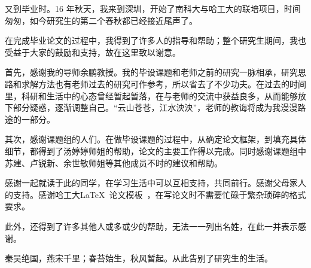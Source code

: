 \begin{acknowledgements}

又到毕业时。16 年秋天，我来到深圳，开始了南科大与哈工大的联培项目，时间匆匆，如今研究生的第二个春秋都已经接近尾声了。

在完成毕业论文的过程中，我得到了许多人的指导和帮助；整个研究生期间，我也受益于大家的鼓励和支持，故在这里致以谢意。

首先，感谢我的导师余鹏教授。我的毕设课题和老师之前的研究一脉相承，研究思路和求解方法也有老师过去的研究可作参考，所以省去了不少功夫。在过去的时间里，科研和生活中的心态曾经暂起暂落，在与老师的交流中获益良多，从而能够放下部分疑惑，逐渐调整自己。“云山苍苍，江水泱泱”，老师的教诲将成为我漫漫路途的一部分。

其次，感谢课题组的人们。在做毕设课题的过程中，从确定论文框架，到填充具体细节，都得到了汤婷婷师姐的帮助，论文的主要工作得以完成。同时感谢课题组中苏建、卢锐新、余世敏师姐等其他成员不时的建议和帮助。

感谢一起就读于此的同学，在学习生活中可以互相支持，共同前行。感谢父母家人的支持。感谢哈工大\LaTeX\ 论文模板\hithesis\ ，在写论文时不需要忙碌于繁杂琐碎的格式要求。

此外，还得到了许多其他人或多或少的帮助，无法一一列出名姓，在此一并表示感谢。

秦吴绝国，燕宋千里；春苔始生，秋风暂起。从此告别了研究生的生活。

\end{acknowledgements}
